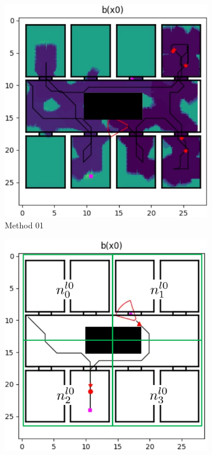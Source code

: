 \begin{figure}
    \centering
    \begin{subfigure}[b]{0.49\textwidth}
        \includegraphics[width=\textwidth]{Report/images/experiments/M1_envbig_problem1_blackbox.png}
        \caption{Method 01}
        \label{subfig:problem1_M1}
    \end{subfigure}
    \begin{subfigure}[b]{0.49\textwidth}
         \includegraphics[width=\textwidth]{Report/images/experiments/M2_envbig_problem1_nodes.png}

\end{subfigure}
\end{figure}
